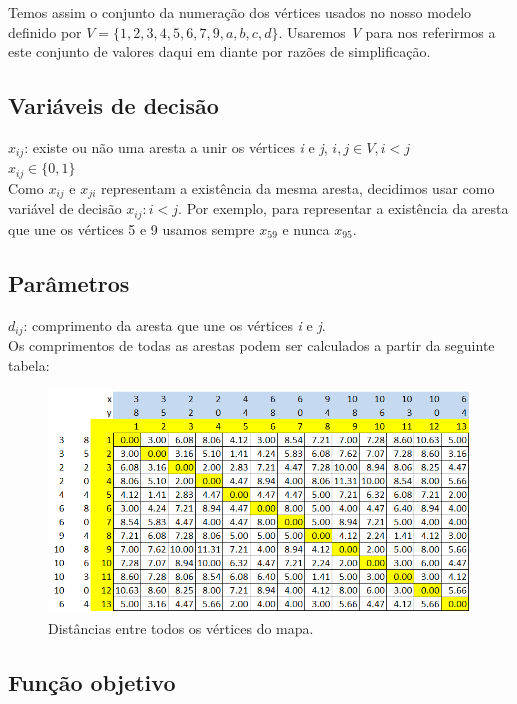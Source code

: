 \documentclass{article}
\begin{document}
Temos assim o conjunto da numeração dos vértices usados no nosso modelo definido por $ V = \{1,2,3,4,5,6,7,9,a,b,c,d\} $. Usaremos \emph{V} para nos referirmos a este conjunto de valores daqui em diante por razões de simplificação.

\subsection{Variáveis de decisão}

\(x_{ij}\): existe ou não uma aresta a unir os vértices \emph{i} e \emph{j}, $ i, j \in V, i < j $\\
\(x_{ij} \in \{ 0,1 \}\)\\

\noindent Como $ x_{ij} $ e $ x_{ji} $ representam a existência da mesma aresta, decidimos usar como variável de decisão $ x_{ij}: i < j $. Por exemplo, para representar a existência da aresta que une os vértices 5 e 9 usamos sempre $ x_{59} $ e nunca $ x_{95} $.

\subsection{Parâmetros}

$ d_{ij} $: comprimento da aresta que une os vértices \emph{i} e \emph{j}.\\
Os comprimentos de todas as arestas podem ser calculados a partir da seguinte tabela:

\begin{figure}[H]
    \centering
    \includegraphics[width=0.8\linewidth]{fig3.png}
    \caption{Distâncias entre todos os vértices do mapa.}
    \label{fig:dists}
\end{figure}

\subsection{Função objetivo}
\end{document}
